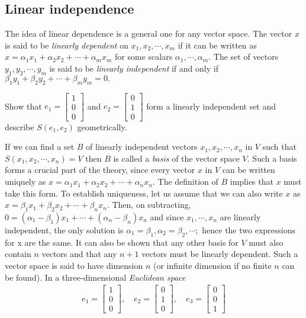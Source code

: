 \documentclass[12pt,a4paper,fleqn]{mycalc}
\begin{document}
	\subsection{Linear independence}
	The idea of linear dependence is a general one for any vector space. The vector $ x $ is said to be \emph{linearly dependent} on $ x_1, x_2, \cdots , x_m $ if it can be written as $ x = \alpha_1x_1 + \alpha_2x_2 + \cdots + \alpha_mx_m $ for some scalars $ \alpha_1,\cdots, \alpha_m. $ The set of vectors $ y_1, y_2, \cdots , y_m $ is said to be \emph{linearly independent} if and only if $ \beta_1y_1 + \beta_2y_2 + \cdots + \beta_my_m = 0. $
	\begin{example}
		Show that $ e_1=\begin{bmatrix}
		1\\
		0\\
		0
		\end{bmatrix} $ and $ e_2=\begin{bmatrix}
		0\\
		1\\
		0
		\end{bmatrix} $ form a linearly independent set and describe $ S(e_1, e_2) $ geometrically.
	\end{example}
	If we can find a set $ B $ of linearly independent vectors $ x_1, x_2, \cdots , x_n $ in $ V $ such that $ S(x_1, x_2, \cdots , x_n) = V $ then $ B $ is called a \emph{basis} of the vector space $ V. $ Such a basis forms a crucial part of the theory, since every vector $ x $ in $ V $ can be written uniquely as $ x = \alpha_1x_1 + \alpha_2x_2 + \cdots + \alpha_nx_n. $ The definition of $ B $ implies that $ x $ must take this form. To establish uniqueness, let us assume that we can also write $ x $ as $ x = \beta_1x_1 + \beta_2x_2 + \cdots + \beta_nx_n. $ Then, on subtracting, $ 0 = (\alpha_1 - \beta_1)x_1 + \cdots + (\alpha_n - \beta_n)x_n $ and since $ x_1, \cdots , x_n $ are linearly independent, the only solution is $ \alpha_1 = \beta_1, \alpha_2 = \beta_2, \cdots ; $ hence the two expressions for x are the same. It can also be shown that any other basis for $ V $ must also contain $ n $ vectors and that any $ n + 1 $ vectors must be linearly dependent. Such a vector space is said to have
	dimension $ n $ (or infinite dimension if no finite $ n $ can be found). In a three-dimensional
	\emph{Euclidean space}
	\begin{align*}
	e_1=\begin{bmatrix}
	1\\
	0\\
	0
	\end{bmatrix},\quad
	e_2=\begin{bmatrix}
	0\\
	1\\
	0
	\end{bmatrix},\quad
	e_3=\begin{bmatrix}
	0\\
	0\\
	1
	\end{bmatrix}
	\end{align*}
\end{document}
